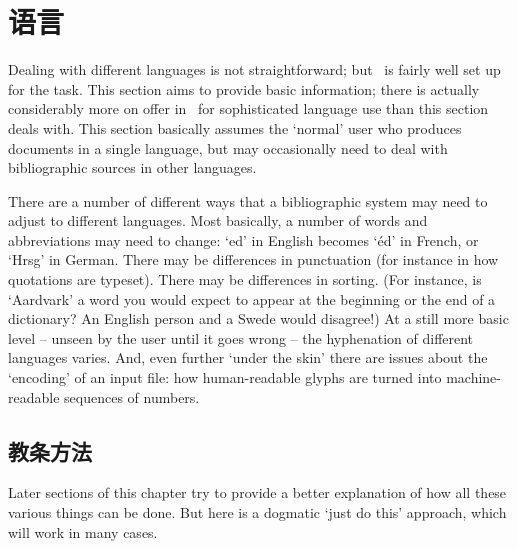 \chapter{语言}\label{ch:languages}

Dealing with different languages is not straightforward; but
\biblatex\ is fairly well set up for the task. This section aims to
provide basic information; there is actually considerably more on
offer in \biblatex\ for sophisticated language use than this section
deals with. This section basically assumes the `normal' user who
produces documents in a single language, but may occasionally need to
deal with bibliographic sources in other languages.

There are a number of different ways that a bibliographic system may
need to adjust to different languages. Most basically, a number of
words and abbreviations may need to change: `ed' in English becomes
`éd' in French, or `Hrsg' in German. There may be differences in
punctuation (for instance in how quotations are typeset). There may be
differences in sorting. (For instance, is `Aardvark' a word you would
expect to appear at the beginning or the end of a dictionary? An
English person and a Swede would disagree!) At a still more basic
level -- unseen by the user until it goes wrong -- the hyphenation of
different languages varies. And, even further `under the skin' there
are issues about the `encoding' of an input file: how human-readable
glyphs are turned into machine-readable sequences of numbers.

\section{教条方法}%

Later sections of this chapter try to provide a better explanation of
how all these various things can be done. But here is a dogmatic `just
do this' approach, which will work in many cases.

